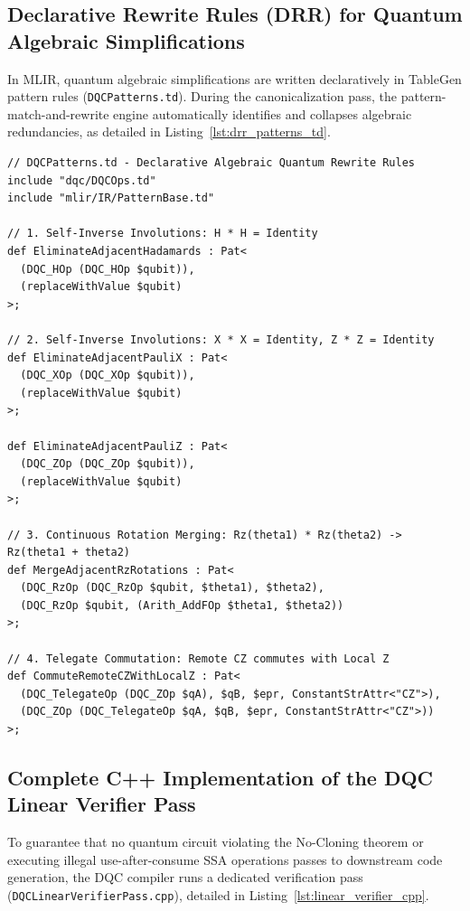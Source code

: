 \subsection{Declarative Rewrite Rules (DRR) for Quantum Algebraic Simplifications}
\label{sec:drr_quantum_patterns}

In MLIR, quantum algebraic simplifications are written declaratively in TableGen pattern rules (\texttt{DQCPatterns.td}). During the canonicalization pass, the pattern-match-and-rewrite engine automatically identifies and collapses algebraic redundancies, as detailed in Listing~\ref{lst:drr_patterns_td}.

\begin{lstlisting}[language=MLIR, caption={Declarative Quantum Rewrite Patterns (DQCPatterns.td)}, label={lst:drr_patterns_td}]
// DQCPatterns.td - Declarative Algebraic Quantum Rewrite Rules
include "dqc/DQCOps.td"
include "mlir/IR/PatternBase.td"

// 1. Self-Inverse Involutions: H * H = Identity
def EliminateAdjacentHadamards : Pat<
  (DQC_HOp (DQC_HOp $qubit)),
  (replaceWithValue $qubit)
>;

// 2. Self-Inverse Involutions: X * X = Identity, Z * Z = Identity
def EliminateAdjacentPauliX : Pat<
  (DQC_XOp (DQC_XOp $qubit)),
  (replaceWithValue $qubit)
>;

def EliminateAdjacentPauliZ : Pat<
  (DQC_ZOp (DQC_ZOp $qubit)),
  (replaceWithValue $qubit)
>;

// 3. Continuous Rotation Merging: Rz(theta1) * Rz(theta2) -> Rz(theta1 + theta2)
def MergeAdjacentRzRotations : Pat<
  (DQC_RzOp (DQC_RzOp $qubit, $theta1), $theta2),
  (DQC_RzOp $qubit, (Arith_AddFOp $theta1, $theta2))
>;

// 4. Telegate Commutation: Remote CZ commutes with Local Z
def CommuteRemoteCZWithLocalZ : Pat<
  (DQC_TelegateOp (DQC_ZOp $qA), $qB, $epr, ConstantStrAttr<"CZ">),
  (DQC_ZOp (DQC_TelegateOp $qA, $qB, $epr, ConstantStrAttr<"CZ">))
>;
\end{lstlisting}

\subsection{Complete C++ Implementation of the DQC Linear Verifier Pass}
\label{sec:cpp_linear_verifier_pass}

To guarantee that no quantum circuit violating the No-Cloning theorem or executing illegal use-after-consume SSA operations passes to downstream code generation, the DQC compiler runs a dedicated verification pass (\texttt{DQCLinearVerifierPass.cpp}), detailed in Listing~\ref{lst:linear_verifier_cpp}.

